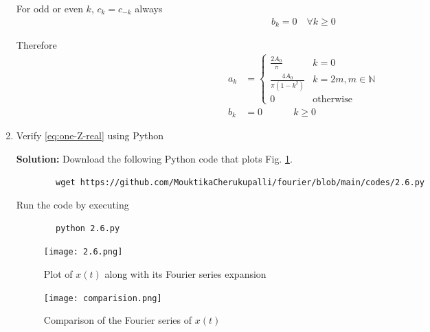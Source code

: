 \documentclass[journal,12pt,twocolumn]{IEEEtran}
\newcommand{\solution}{\noindent \textbf{Solution: }}
\numberwithin{equation}{section}
\numberwithin{figure}{section}
\renewcommand\thesection{\arabic{section}}
\begin{document}
\begin{enumerate}[label=\thesection.\arabic*,ref=\thesection.\theenumi]
	For odd or even $k$, $c_k = c_{-k}$ always
	\begin{align}
		b_k = 0 \quad \forall k \ge 0
	\end{align}
	
	Therefore
	\begin{align}
		a_k &=
		\begin{cases}
			\frac{2A_0}{\pi} & k = 0 \\
			\frac{4A_0}{\pi(1-k^2)} & k = 2m, m \in \mathbb{N} \\
			0 & \text{otherwise}
		\end{cases} \\
		b_k &= 0 \qquad \quad ~ k \ge 0
	\end{align}
	
	\item Verify \eqref{eq:one-Z-real} using Python
	
	\solution Download the following Python code that plots Fig. \ref{fig-2.6}.
	\begin{lstlisting}
		wget https://github.com/MouktikaCherukupalli/fourier/blob/main/codes/2.6.py
	\end{lstlisting}
	
	Run the code by executing
	\begin{lstlisting}
		python 2.6.py
	\end{lstlisting}

	\begin{figure}[!ht]
		\centering
		\texttt{[image: 2.6.png]}
		\caption{Plot of $x(t)$ along with its Fourier series expansion}
		\label{fig-2.6}	
	\end{figure}
	
	\begin{figure}[!ht]
		\centering
		\texttt{[image: comparision.png]}
		\caption{Comparison of the Fourier series of $x(t)$}
		\label{fig-comparison}	
	\end{figure}
	\end{enumerate}
\end{document}
